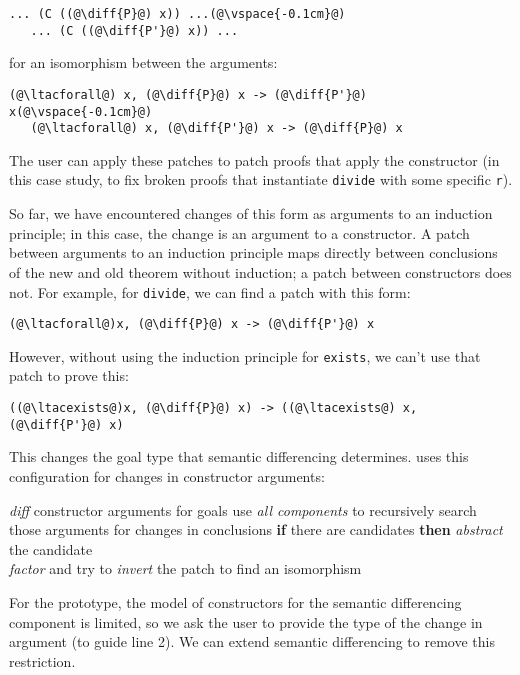 \begin{lstlisting}[language=coq]
   ... (C ((@\diff{P}@) x)) ...(@\vspace{-0.1cm}@)
   ... (C ((@\diff{P'}@) x)) ...
\end{lstlisting}
for an isomorphism between the arguments:

\begin{lstlisting}[language=coq]
   (@\ltacforall@) x, (@\diff{P}@) x -> (@\diff{P'}@) x(@\vspace{-0.1cm}@)
   (@\ltacforall@) x, (@\diff{P'}@) x -> (@\diff{P}@) x
\end{lstlisting}

The user can apply these patches to patch proofs that apply the constructor (in this case study,
to fix broken proofs that instantiate \lstinline{divide} with some specific \lstinline{r}).

So far, we have encountered changes of this form as arguments to an 
induction principle; in this case, the change is an argument to a constructor.
A patch between arguments to an induction principle maps
directly between conclusions of the new and old theorem without
induction; a patch between constructors does not.
For example, for \lstinline{divide}, we can find a patch with this form:

\begin{lstlisting}[language=coq]
   (@\ltacforall@)x, (@\diff{P}@) x -> (@\diff{P'}@) x
\end{lstlisting}

However, without using the induction principle for \lstinline{exists}, we can't use that patch to prove this:

\begin{lstlisting}[language=coq]
   ((@\ltacexists@)x, (@\diff{P}@) x) -> ((@\ltacexists@) x, (@\diff{P'}@) x)
\end{lstlisting}

This changes the goal type that semantic differencing determines.
\sysname uses this configuration for changes in constructor arguments:

\begin{algorithm}
\footnotesize
\begin{algorithmic}[1]
    \STATE \textit{diff} constructor arguments for goals
    \STATE use \textit{all components} to recursively search those arguments for changes in conclusions
    \STATE \textbf{if} there are candidates \textbf{then}
    \STATE \hspace*{1em} \textit{abstract} the candidate \\
           \hspace*{1em} \textit{factor} and try to \textit{invert} the patch to find an isomorphism
\end{algorithmic}
\end{algorithm}

For the prototype, the model of constructors for the semantic differencing component is limited,
so we ask the user to provide the type of the change in argument (to guide line 2).
We can extend semantic differencing to remove this restriction.





